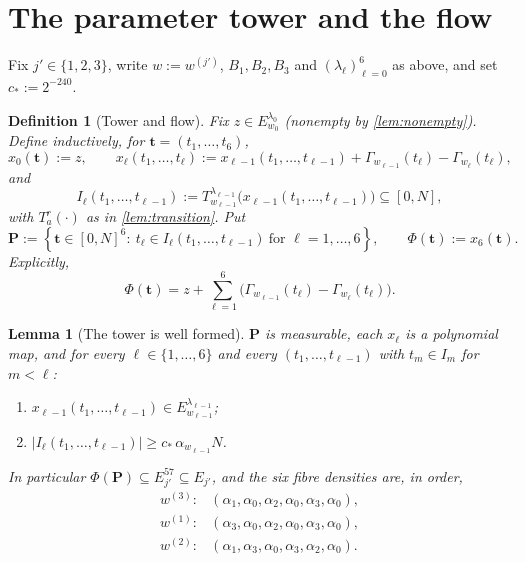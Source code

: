 \documentclass[11pt]{article}
\newtheorem{lemma}[theorem]{Lemma}
\newtheorem{definition}[theorem]{Definition}
\newcommand{\abs}[1]{\left|#1\right|}
\newcommand{\set}[1]{\left\{#1\right\}}
\newcommand{\indices}{\{1,2,3\}}
\begin{document}
\section{The parameter tower and the flow}
\label{sec:tower}

Fix $j'\in\indices$, write $w:=w^{(j')}$, $B_1,B_2,B_3$ and
$(\lambda_\ell)_{\ell=0}^6$ as above, and set $c_\ast:=2^{-240}$.

\begin{definition}[Tower and flow]
  \label{def:flow}
  Fix $z\in E_{w_0}^{\lambda_0}$ (nonempty by \cref{lem:nonempty}).  Define
  inductively, for $\mathbf t=(t_1,\dots,t_6)$,
  \[
    x_0(\mathbf t):=z,\qquad
    x_\ell(t_1,\dots,t_\ell):=x_{\ell-1}(t_1,\dots,t_{\ell-1})
      +\Gamma_{w_{\ell-1}}(t_\ell)-\Gamma_{w_\ell}(t_\ell),
  \]
  and
  \[
    I_\ell(t_1,\dots,t_{\ell-1}):=T^{\lambda_{\ell-1}}_{w_{\ell-1}}
      \bigl(x_{\ell-1}(t_1,\dots,t_{\ell-1})\bigr)\subseteq[0,N],
  \]
  with $T^r_a(\cdot)$ as in \cref{lem:transition}.  Put
  \[
    \mathbf P:=\set{\mathbf t\in[0,N]^6:\ t_\ell\in I_\ell(t_1,\dots,t_{\ell-1})\ \text{for }\ell=1,\dots,6},
    \qquad \Phi(\mathbf t):=x_6(\mathbf t).
  \]
  Explicitly,
  \begin{equation}
    \label{eq:flow-explicit}
    \Phi(\mathbf t)=z+\sum_{\ell=1}^{6}\bigl(\Gamma_{w_{\ell-1}}(t_\ell)-\Gamma_{w_\ell}(t_\ell)\bigr).
  \end{equation}
\end{definition}

\begin{lemma}[The tower is well formed]
  \label{lem:tower}
  $\mathbf P$ is measurable, each $x_\ell$ is a polynomial map, and for every
  $\ell\in\{1,\dots,6\}$ and every $(t_1,\dots,t_{\ell-1})$ with
  $t_m\in I_m$ for $m<\ell$:
  \begin{enumerate}[label=(\roman*)]
    \item $x_{\ell-1}(t_1,\dots,t_{\ell-1})\in E_{w_{\ell-1}}^{\lambda_{\ell-1}}$;
    \item $\abs{I_\ell(t_1,\dots,t_{\ell-1})}\geq c_\ast\,\alpha_{w_{\ell-1}}N$.
  \end{enumerate}
  In particular $\Phi(\mathbf P)\subseteq E_{j'}^{57}\subseteq E_{j'}$, and the
  six fibre densities are, in order,
  \[
    \begin{array}{ll}
      w^{(3)}: & (\alpha_1,\alpha_0,\alpha_2,\alpha_0,\alpha_3,\alpha_0),\\
      w^{(1)}: & (\alpha_3,\alpha_0,\alpha_2,\alpha_0,\alpha_3,\alpha_0),\\
      w^{(2)}: & (\alpha_1,\alpha_3,\alpha_0,\alpha_3,\alpha_2,\alpha_0).
    \end{array}
  \]
\end{lemma}
\end{document}
